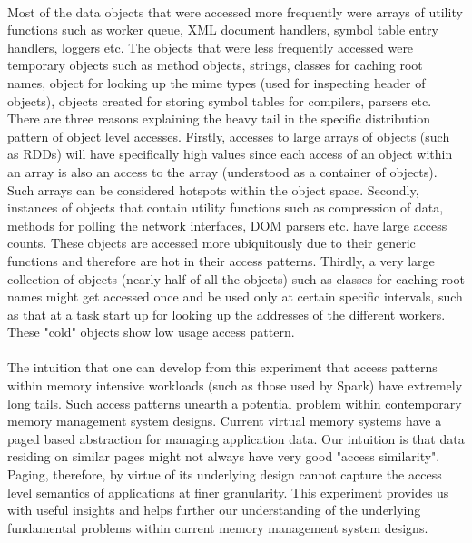 \paragraph{}
Most of the data objects that were accessed more frequently were arrays of utility functions such as worker queue, XML document handlers, symbol table entry handlers, loggers etc. The objects that were less frequently accessed were temporary objects such as method objects, strings, classes for caching root names, object for looking up the mime types (used for inspecting header of objects), objects created for storing symbol tables for compilers, parsers etc. There are three reasons explaining the heavy tail in the specific distribution pattern of object level accesses. Firstly, accesses to large arrays of objects (such as RDDs) will have specifically high values since each access of an object within an array is also an access to the array (understood as a container of objects). Such arrays can be considered hotspots within the object space. Secondly, instances of objects that contain utility functions such as compression of data, methods for polling the network interfaces, DOM parsers etc. have large access counts. These objects are accessed more ubiquitously due to their generic functions and therefore are hot in their access patterns. Thirdly, a very large collection of objects (nearly half of all the objects) such as classes for caching root names might get accessed once and be used only at certain specific intervals, such as that at a task start up for looking up the addresses of the different workers.  These "cold" objects show low usage access pattern. 
\paragraph{}	
The intuition that one can develop from this experiment that access patterns within memory intensive workloads (such as those used by Spark) have extremely long tails. Such access patterns unearth a potential problem within contemporary memory management system designs. Current virtual memory systems have a paged based abstraction for managing application data. Our intuition is that data residing on similar pages might not always have very good "access similarity". Paging, therefore, by virtue of its underlying design cannot capture the access level semantics of applications at finer granularity. This experiment provides us with useful insights and helps further our understanding of the underlying fundamental problems within current memory management system designs.

